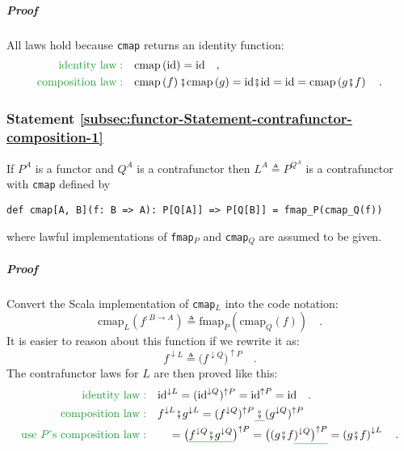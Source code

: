\subparagraph{Proof}

All laws hold because \lstinline!cmap! returns an identity function:
\begin{align*}
{\color{greenunder}\text{identity law}:}\quad & \text{cmap}\left(\text{id}\right)=\text{id}\quad,\\
{\color{greenunder}\text{composition law}:}\quad & \text{cmap}\left(f\right)\bef\text{cmap}\left(g\right)=\text{id}\bef\text{id}=\text{id}=\text{cmap}\left(g\bef f\right)\quad.
\end{align*}


\subsubsection{Statement \label{subsec:functor-Statement-contrafunctor-composition-1}\ref{subsec:functor-Statement-contrafunctor-composition-1}}

If $P^{A}$ is a functor and $Q^{A}$ is a contrafunctor then $L^{A}\triangleq P^{Q^{A}}$
is a contrafunctor with \lstinline!cmap! defined by
\begin{lstlisting}
def cmap[A, B](f: B => A): P[Q[A]] => P[Q[B]] = fmap_P(cmap_Q(f))
\end{lstlisting}
where lawful implementations of \lstinline!fmap!$_{P}$ and \lstinline!cmap!$_{Q}$
are assumed to be given.

\subparagraph{Proof}

Convert the Scala implementation of \lstinline!cmap!$_{L}$ into
the code notation:
\[
\text{cmap}_{L}(f^{:B\rightarrow A})\triangleq\text{fmap}_{P}(\text{cmap}_{Q}(f))\quad.
\]
It is easier to reason about this function if we rewrite it as:
\[
f^{\downarrow L}\triangleq\big(f^{\downarrow Q}\big)^{\uparrow P}\quad.
\]
The contrafunctor laws for $L$ are then proved like this:
\begin{align*}
{\color{greenunder}\text{identity law}:}\quad & \text{id}^{\downarrow L}=(\text{id}^{\downarrow Q})^{\uparrow P}=\text{id}^{\uparrow P}=\text{id}\quad.\\
{\color{greenunder}\text{composition law}:}\quad & f^{\downarrow L}\bef g^{\downarrow L}=(f^{\downarrow Q})^{\uparrow P}\gunderline{\,\bef\,}(g^{\downarrow Q})^{\uparrow P}\\
{\color{greenunder}\text{use }P\text{\textsf{'}s composition law}:}\quad & \quad=\big(\gunderline{f^{\downarrow Q}\bef g^{\downarrow Q}}\big)^{\uparrow P}=\big((g\bef f\gunderline{)^{\downarrow Q}\big)^{\uparrow P}}=\left(g\bef f\right)^{\downarrow L}\quad.
\end{align*}

